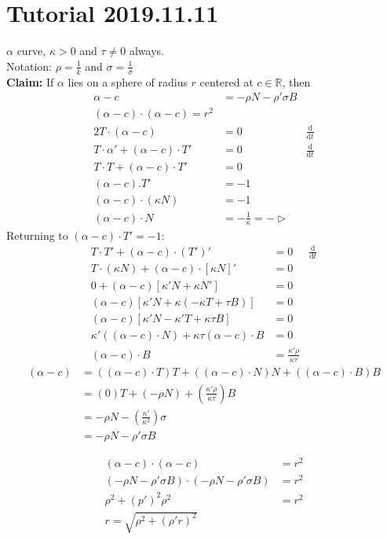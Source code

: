 \documentclass{article}
\renewcommand{\d}{\mathrm{d}}
\newcommand{\R}{\mathbb{R}}
\newcommand{\dv}[2]{\frac{\d #1}{\d #2}}
\theoremstyle{definition}
\theoremstyle{remark}
\theoremstyle{example}
\begin{document}
	\section*{Tutorial 2019.11.11}
	$\alpha$ curve, $\kappa > 0$ and $\tau \neq 0$ always.\\
	Notation: $\rho = \frac{1}{k}$ and $\sigma = \frac{1}{\sigma}$\\
	\textbf{Claim:} If $\alpha$ lies on a sphere of radius $r$ centered at $c \in \R$, then \begin{align*}
		\alpha - c &= - \rho N - \rho ' \sigma B\\
		(\alpha-c) \cdot (\alpha - c) = r^2\\
		2T \cdot (\alpha - c) & = 0  & \dv{}{t}\\
		T \cdot \alpha' + (\alpha-c) \cdot T' &= 0 & \dv{}{t}\\
		T\cdot T + (\alpha - c) \cdot T' & = 0\\
		(\alpha-c).T'&=-1\\
		(\alpha-c) \cdot (\kappa N) & = -1\\
		(\alpha-c ) \cdot N &= -\frac{1}{\kappa} = - \rhd
	\end{align*}
	Returning to $(\alpha-c)\cdot T'=-1$:
	\begin{align*}
		T\cdot T' + (\alpha-c) \cdot (T')' & = 0 & \dv{}{t}\\
		T \cdot (\kappa N) + (\alpha -c )\cdot [\kappa N]' & = 0\\
		0 + (\alpha -c )[\kappa'N+\kappa N'] & = 0\\
		(\alpha - c)[\kappa'N + \kappa(-\kappa T+\tau B)] & = 0\\
		(\alpha - c)[\kappa'N-\kappa'T+\kappa\tau B] & = 0\\
		\kappa'((\alpha-c)\cdot N) + \kappa \tau (\alpha - c) \cdot B & = 0\\
		(\alpha - c)\cdot B &= \frac{\kappa'\rho}{\kappa \tau}
	\end{align*}
	\begin{align*}
		(\alpha - c)&=((\alpha - c) \cdot T) T + ((\alpha - c) \cdot N) N + ((\alpha - c)\cdot B) B\\
		& = (0)T + (-\rho N) + (\frac{\kappa' \rho}{\kappa \tau}) B\\
		& = -\rho N - \left(\frac{\kappa'}{\kappa^2}\right)\sigma\\
		& = -\rho N - \rho' \sigma B
	\end{align*}
	
	\begin{align*}
		(\alpha - c) \cdot(\alpha - c)&=r^2\\
		(-\rho N - \rho'\sigma B)\cdot(-\rho N - \rho' \sigma B) &= r^2\\
		\rho^2+(p')^2\rho^2&=r^2\\
		r=\sqrt{\rho^2+(\rho'r)^2}
	\end{align*}
	
\end{document}
